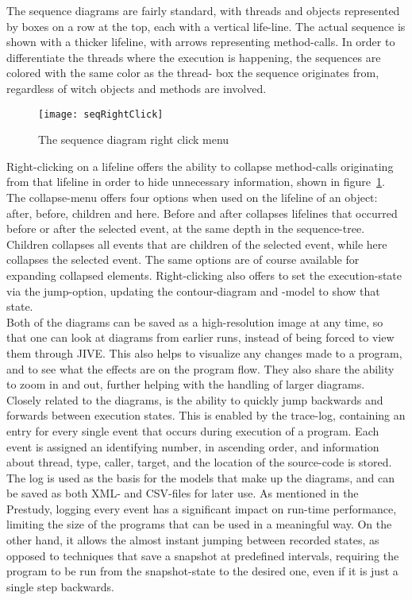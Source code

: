 The sequence diagrams are fairly standard, with threads and objects represented by boxes on a row at the top, each with a vertical life-line.%
The actual sequence is shown with a thicker lifeline, with arrows representing method-calls.
In order to differentiate the threads where the execution is happening, the sequences are colored with the same color as the thread- box the sequence originates from, regardless of witch objects and methods are involved.
\begin{figure}[h]
	\texttt{[image: seqRightClick]}
	\caption{The sequence diagram right click menu}
	\label{fig:seqRightClick}
\end{figure}
Right-clicking on a lifeline offers the ability to collapse method-calls originating from that lifeline in order to hide unnecessary information, shown in  figure~\ref{fig:seqRightClick}.
The collapse-menu offers four options when used on the lifeline of an object: after, before, children and here.
Before and after collapses lifelines that occurred before or after the selected event, at the same depth in the sequence-tree.
Children collapses all events that are children of the selected event, while here collapses the selected event.%
The same options are of course available for expanding collapsed elements.
Right-clicking also offers to set the execution-state via the jump-option, updating the contour-diagram and -model to show that state.
~\\

Both of the diagrams can be saved as a high-resolution image at any time, so that one can look at diagrams from earlier runs, instead of being forced to view them through JIVE.
This also helps to visualize any changes made to a program, and to see what the effects are on the program flow.
They also share the ability to zoom in and out, further helping with the handling of larger diagrams.
~\\

Closely related to the diagrams, is the ability to quickly jump backwards and forwards between execution states.
This is enabled by the trace-log, containing an entry for every single event that occurs during execution of a program.
Each event is assigned an identifying number, in ascending order, and information about thread, type, caller, target, and the location of the source-code is stored.
The log is used as the basis for the models that make up the diagrams, and can be saved as both XML- and CSV-files for later use.
As mentioned in the Prestudy, logging every event has a significant impact on run-time performance, limiting the size of the programs that can be used in a meaningful way.
On the other hand, it allows the almost instant jumping between recorded states, as opposed to techniques that save a snapshot at predefined intervals, requiring the program to be run from the snapshot-state to the desired one, even if it is just a single step backwards.
~\\

